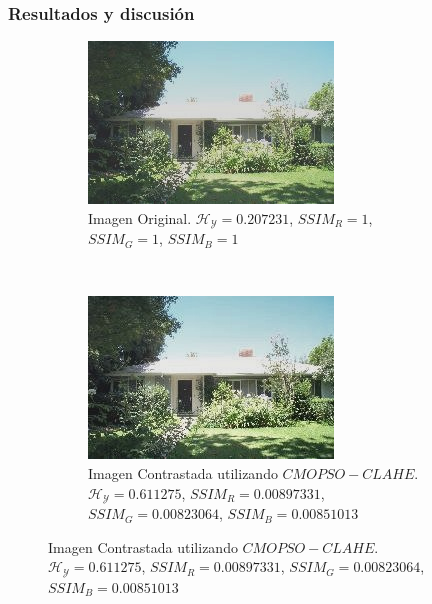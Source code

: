 \documentclass[usenames,dvipsnames]{beamer}
\begin{document}
\begin{frame}
\frametitle{Resultados y discusión} 

\begin{figure}[H]
\centering
\begin{subfigure}[t]{0.45\textwidth}
\includegraphics[width=\textwidth]{graphics/calhouse_0230.jpg}
\caption{Imagen Original. $\mathscr{H_Y}=0.207231$, $SSIM_R=1$, $SSIM_G=1$, $SSIM_B=1$}
\label{fig:casa1original}
\end{subfigure}
    ~ %
      \begin{subfigure}[t]{0.45\textwidth}
      \includegraphics[width=\textwidth]{graphics/calhouse_0230_20-25165283474-10.jpg}
      \caption{Imagen Contrastada utilizando $CMOPSO-CLAHE$. $\mathscr{H_Y}=0.611275$, $SSIM_R=0.00897331$, $SSIM_G=0.00823064$, $SSIM_B=0.00851013$}

\end{subfigure}
\end{figure}
\end{frame}
\end{document}
